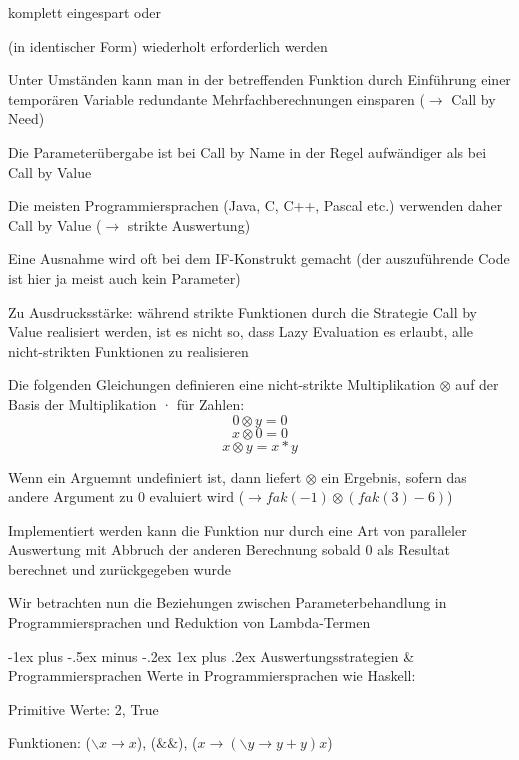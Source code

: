 \documentclass[10pt]{article}
\makeatletter
\renewcommand{\subsubsection}{\@startsection{subsubsection}{3}{0mm}%
                                {-1ex plus -.5ex minus -.2ex}%
                                {1ex plus .2ex}%
                                {\normalfont\small\bfseries}}
\makeatother
\begin{document}
\begin{itemize*}
    \begin{itemize*}
      \item komplett eingespart oder
      \item (in identischer Form) wiederholt erforderlich werden
      \item Unter Umständen kann man in der betreffenden Funktion durch Einführung einer temporären Variable redundante Mehrfachberechnungen einsparen ($\rightarrow$ Call by Need)
    \end{itemize*}
    \item Die Parameterübergabe ist bei Call by Name in der Regel aufwändiger als bei Call by Value
    \begin{itemize*}
      \item Die meisten Programmiersprachen (Java, C, C++, Pascal etc.) verwenden daher Call by Value ($\rightarrow$ strikte Auswertung)
      \item Eine Ausnahme wird oft bei dem IF-Konstrukt gemacht (der auszuführende Code ist hier ja meist auch kein Parameter)
    \end{itemize*}
    \item Zu Ausdrucksstärke: während strikte Funktionen durch die Strategie Call by Value realisiert werden, ist es nicht so, dass Lazy Evaluation es erlaubt, alle nicht-strikten Funktionen zu realisieren
    \begin{itemize*}
      \item Die folgenden Gleichungen definieren eine nicht-strikte Multiplikation $\otimes$ auf der Basis der Multiplikation · für Zahlen:
      $$0 \otimes y = 0$$
      $$x \otimes 0 = 0$$
      $$x \otimes y = x * y$$
      \item Wenn ein Arguemnt undefiniert ist, dann liefert $\otimes$ ein Ergebnis, sofern das andere Argument zu 0 evaluiert wird ($\rightarrow fak(-1) \otimes (fak(3)-6)$)
      \item Implementiert werden kann die Funktion nur durch eine Art von paralleler Auswertung mit Abbruch der anderen Berechnung sobald 0 als Resultat berechnet und zurückgegeben wurde
    \end{itemize*}
    \item Wir betrachten nun die Beziehungen zwischen Parameterbehandlung in Programmiersprachen und Reduktion von Lambda-Termen
  \end{itemize*}
  
  \subsubsection{Auswertungsstrategien \& Programmiersprachen}
  \color{blue} Werte in Programmiersprachen wie Haskell: \color{black}
  \begin{itemize*}
    \item Primitive Werte: 2, True
    \item Funktionen: ($\backslash x \rightarrow x$), ($\&\&$), ($x\rightarrow(\backslash y\rightarrow y+y)x$)
  \end{itemize*}
  
\end{document}
